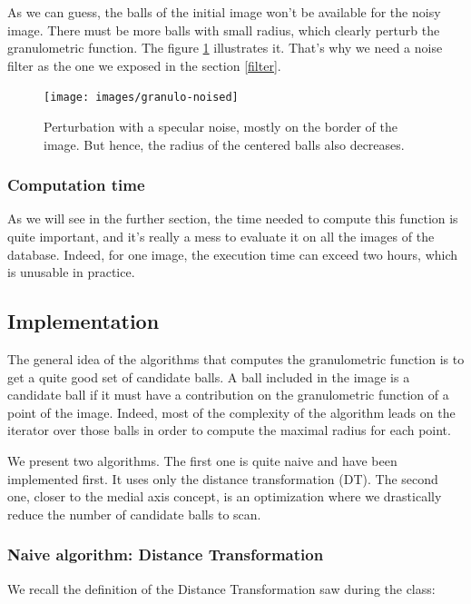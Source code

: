 As we can guess, the balls of the initial image won't be available for the noisy image. There must be more balls with small radius, which clearly perturb the granulometric function. The figure \ref{device9-6-noised} illustrates it. That's why we need a noise filter as the one we exposed in the section \ref{filter}.

\begin{figure}[!ht]
    \centering
    \texttt{[image: images/granulo-noised]}
    \caption{Perturbation with a specular noise, mostly on the border of the image. But hence, the radius of the centered balls also decreases.}
	\label{device9-6-noised}
\end{figure}

\subsubsection{Computation time}

As we will see in the further section, the time needed to compute this function is quite important, and it's really a mess to evaluate it on all the images of the database. Indeed, for one image, the execution time can exceed two hours, which is unusable in practice.

\subsection{Implementation}

The general idea of the algorithms that computes the granulometric function is to get a quite good set of candidate balls. A ball included in the image is a candidate ball if it must have a contribution on the granulometric function of a point of the image. Indeed, most of the complexity of the algorithm leads on the iterator over those balls in order to compute the maximal radius for each point. 

We present two algorithms. The first one is quite naive and have been implemented first. It uses only the distance transformation (DT). The second one, closer to the medial axis concept, is an optimization where we drastically reduce the number of candidate balls to scan.

\subsubsection{Naive algorithm: Distance Transformation}

We recall the definition of the Distance Transformation saw during the class:

